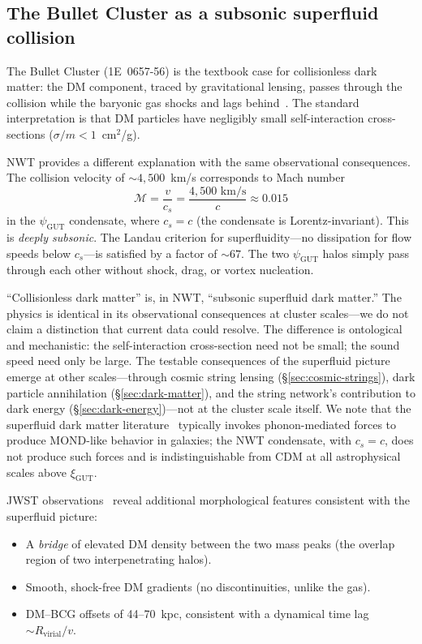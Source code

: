 \documentclass[11pt]{article}
\begin{document}
\subsection{The Bullet Cluster as a subsonic superfluid collision}

The Bullet Cluster (1E~0657-56) is the textbook case for collisionless dark matter: the DM component, traced by gravitational lensing, passes through the collision while the baryonic gas shocks and lags behind~\cite{JWST-Bullet2025}.
The standard interpretation is that DM particles have negligibly small self-interaction cross-sections ($\sigma/m < 1$~cm$^2$/g).

NWT provides a different explanation with the same observational consequences.
The collision velocity of $\sim 4{,}500$~km/s corresponds to Mach number
\begin{equation}
\mathcal{M} = \frac{v}{c_s} = \frac{4{,}500\text{ km/s}}{c} \approx 0.015
\end{equation}
in the $\psi_\text{GUT}$ condensate, where $c_s = c$ (the condensate is Lorentz-invariant).
This is \emph{deeply subsonic}.
The Landau criterion for superfluidity---no dissipation for flow speeds below $c_s$---is satisfied by a factor of $\sim 67$.
The two $\psi_\text{GUT}$ halos simply pass through each other without shock, drag, or vortex nucleation.

``Collisionless dark matter'' is, in NWT, ``subsonic superfluid dark matter.''
The physics is identical in its observational consequences at cluster scales---we do not claim a distinction that current data could resolve.
The difference is ontological and mechanistic: the self-interaction cross-section need not be small; the sound speed need only be large.
The testable consequences of the superfluid picture emerge at other scales---through cosmic string lensing (\S\ref{sec:cosmic-strings}), dark particle annihilation (\S\ref{sec:dark-matter}), and the string network's contribution to dark energy (\S\ref{sec:dark-energy})---not at the cluster scale itself.
We note that the superfluid dark matter literature~\cite{BerezhianiKhoury2015} typically invokes phonon-mediated forces to produce MOND-like behavior in galaxies; the NWT condensate, with $c_s = c$, does not produce such forces and is indistinguishable from CDM at all astrophysical scales above $\xi_\text{GUT}$.

JWST observations~\cite{JWST-Bullet2025} reveal additional morphological features consistent with the superfluid picture:
\begin{itemize}
\item A \emph{bridge} of elevated DM density between the two mass peaks (the overlap region of two interpenetrating halos).
\item Smooth, shock-free DM gradients (no discontinuities, unlike the gas).
\item DM--BCG offsets of 44--70~kpc, consistent with a dynamical time lag $\sim R_\text{virial}/v$.
\end{itemize}
\end{document}
